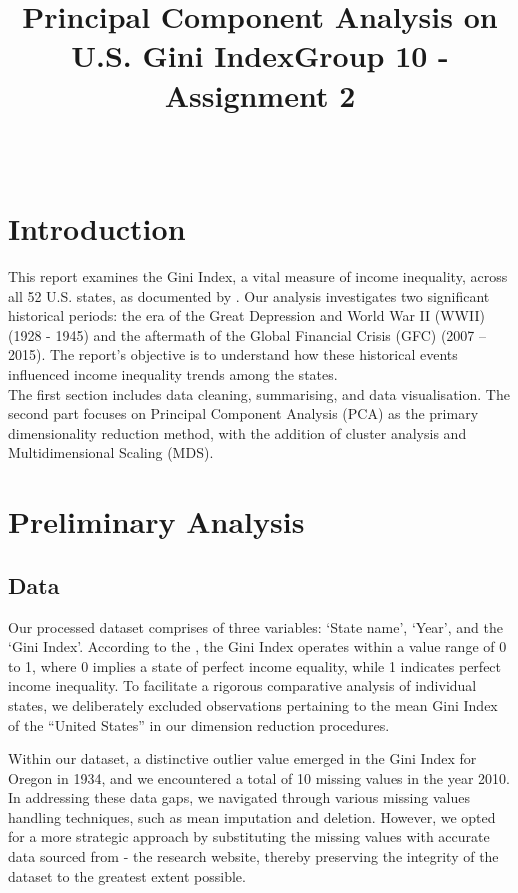 \documentclass[11pt,a4paper,]{article}
\title{Principal Component Analysis on U.S. Gini Index\newline Group 10 - Assignment 2}
\author{\sf{\Large\textbf{Alexandra Goh}\\\large \href{mailto:agoh0008@student.monash.edu}{\nolinkurl{agoh0008@student.monash.edu}}\\[0.5cm]}{\Large\textbf{Evan Ginting}\\\large \href{mailto:egin0003@student.monash.edu}{\nolinkurl{egin0003@student.monash.edu}}\\[0.5cm]}{\Large\textbf{Huyen-Anh Pham}\\\large \href{mailto:hpha0042@student.monash.edu}{\nolinkurl{hpha0042@student.monash.edu}}\\[0.5cm]}{\Large\textbf{Pei Ni Lim}\\\large \href{mailto:plim0015@student.monash.edu}{\nolinkurl{plim0015@student.monash.edu}}\\[0.5cm]}}
\date{\sf\Date~\Month~\Year}
\makeatletter
\def\titlepage{\front{\expandafter{\@title}}{\@author}{\@organization}}
\makeatother
\begin{document}
\titlepage

{
\setcounter{tocdepth}{2}
\tableofcontents
}
\newpage

\hypertarget{introduction}{%
\section{Introduction}\label{introduction}}

This report examines the Gini Index, a vital measure of income inequality, across all 52 U.S. states, as documented by \textcite{FF10}. Our analysis investigates two significant historical periods: the era of the Great Depression and World War II (WWII) (1928 - 1945) and the aftermath of the Global Financial Crisis (GFC) (2007 -- 2015). The report's objective is to understand how these historical events influenced income inequality trends among the states.\\
The first section includes data cleaning, summarising, and data visualisation. The second part focuses on Principal Component Analysis (PCA) as the primary dimensionality reduction method, with the addition of cluster analysis and Multidimensional Scaling (MDS).

\hypertarget{preliminary-analysis}{%
\section{Preliminary Analysis}\label{preliminary-analysis}}

\hypertarget{data}{%
\subsection{Data}\label{data}}

Our processed dataset comprises of three variables: `State name', `Year', and the `Gini Index'. According to the \textcite{USC21}, the Gini Index operates within a value range of 0 to 1, where 0 implies a state of perfect income equality, while 1 indicates perfect income inequality. To facilitate a rigorous comparative analysis of individual states, we deliberately excluded observations pertaining to the mean Gini Index of the ``United States'' in our dimension reduction procedures.

Within our dataset, a distinctive outlier value emerged in the Gini Index for Oregon in 1934, and we encountered a total of 10 missing values in the year 2010. In addressing these data gaps, we navigated through various missing values handling techniques, such as mean imputation and deletion. However, we opted for a more strategic approach by substituting the missing values with accurate data sourced from \textcite{Update1715} - the research website, thereby preserving the integrity of the dataset to the greatest extent possible.
\end{document}
